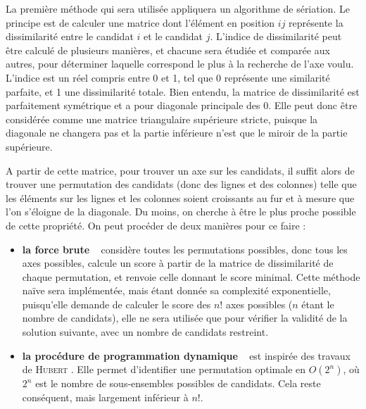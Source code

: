 \documentclass[11pt, a4paper]{article}
\begin{document}
La premi\`{e}re m\'{e}thode qui sera utilis\'{e}e appliquera un algorithme de s\'{e}riation. Le principe est de calculer une matrice dont l'élément en position $ij$ repr\'{e}sente la dissimilarit\'{e} entre le candidat $i$ et le candidat $j$. L'indice de dissimilarité peut \^{e}tre calcul\'{e} de plusieurs mani\`{e}res, et chacune sera \'{e}tudi\'{e}e et compar\'{e}e aux autres, pour d\'{e}terminer laquelle correspond le plus \`{a} la recherche de l'axe voulu. L'indice est un r\'{e}el compris entre 0 et 1, tel que 0 repr\'{e}sente une similarit\'{e} parfaite, et 1 une dissimilarit\'{e} totale. Bien entendu, la matrice de dissimilarité est parfaitement sym\'{e}trique et a pour diagonale principale des 0. Elle peut donc \^{e}tre consid\'{e}r\'{e}e comme une matrice triangulaire sup\'{e}rieure stricte, puisque la diagonale ne changera pas et la partie inf\'{e}rieure n'est que le miroir de la partie sup\'{e}rieure.

A partir de cette matrice, pour trouver un axe sur les candidats, il suffit alors de trouver une permutation des candidats (donc des lignes et des colonnes) telle que les \'{e}l\'{e}ments sur les lignes et les colonnes soient croissants au fur et \`{a} mesure que l'on s'\'{e}loigne de la diagonale. Du moins, on cherche à être le plus proche possible de cette propriété. On peut procéder de deux manières pour ce faire :\\

\begin{itemize}
\item  \textbf{la force brute} ~  considère toutes les permutations possibles, donc tous les axes possibles, calcule un score \`{a} partir de la matrice de dissimilarit\'{e} de chaque permutation, et renvoie celle donnant le score minimal. Cette m\'{e}thode na\"{i}ve sera impl\'{e}ment\'{e}e, mais \'{e}tant donn\'{e}e sa complexit\'{e} exponentielle, puisqu'elle demande de calculer le score des $n!$ axes possibles ($n$ \'{e}tant le nombre de candidats), elle ne sera utilis\'{e}e que pour v\'{e}rifier la validit\'{e} de la solution suivante, avec un nombre de candidats restreint.\\

\item \textbf{la procédure de programmation dynamique} ~ est inspir\'{e}e des travaux de \textsc{Hubert} \cite{huberDynamic}. Elle permet d'identifier une permutation optimale en $O(2^n)$, où $2^n$ est le nombre de sous-ensembles possibles de candidats. Cela reste conséquent, mais largement inférieur à $n!$.
\end{itemize}
\end{document}
